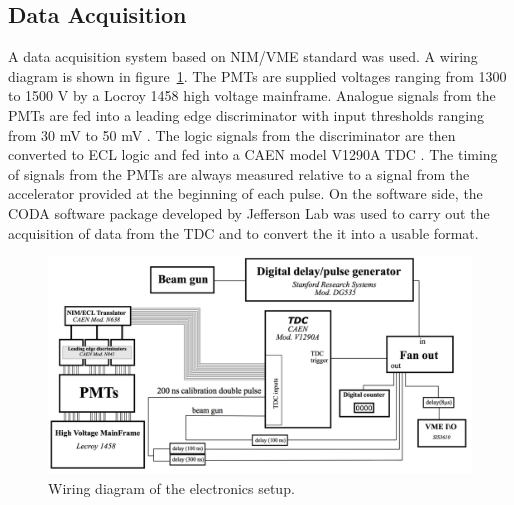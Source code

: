 \subsection{Data Acquisition}
A data acquisition system based on NIM/VME standard was used.
A wiring diagram is shown in figure~\ref{fig:WiringDiagram}.
The PMTs are supplied voltages ranging from 1300 to 1500 V by a Locroy 1458 high voltage mainframe.
Analogue signals from the PMTs are fed into a leading edge discriminator with input thresholds ranging from 30 mV to 50 mV .
The logic signals from the discriminator are then converted to ECL logic and fed into a CAEN model V1290A TDC .
The timing of signals from the PMTs are always measured relative to a signal from the accelerator provided at the beginning of each pulse.
On the software side, the CODA software package developed by Jefferson Lab was used to carry out the acquisition of data from the TDC and to convert the it into a usable format.
\begin{figure}[h]
\includegraphics[width=\textwidth]{Content/Methods/WiringDiagram.png}
\caption{Wiring diagram of the electronics setup. }
\label{fig:WiringDiagram}
\end{figure}